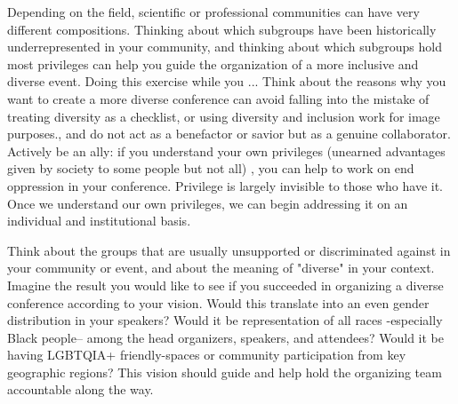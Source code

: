 \documentclass[10pt,letterpaper]{article}
\begin{document}
Depending on the field, scientific or professional communities can have very different compositions. Thinking about which subgroups have been historically underrepresented in your community, and thinking about which subgroups hold most privileges can help you guide the organization of a more inclusive and diverse event. Doing this exercise while you ...
Think about the reasons why you want to create a more diverse conference can avoid falling into the mistake of treating diversity as a checklist, or using diversity and inclusion work for image purposes., and do not act as a benefactor or savior but as a genuine collaborator.
Actively be an ally: if you understand your own privileges (unearned advantages given by society to some people but not all) \cite{}, you can help to work on end oppression in your conference. Privilege is largely invisible to those who have it. Once we understand our own privileges, we can begin addressing it on an individual and institutional basis.

Think about the groups that are usually unsupported or discriminated against in your community or event, and about the meaning of "diverse" in your context. Imagine the result you would like to see if you succeeded in organizing a diverse conference according to your vision. Would this translate into an even gender distribution in your speakers? Would it be representation of all races -especially Black people-- among the head organizers, speakers, and attendees? Would it be having LGBTQIA+ friendly-spaces or community participation from key geographic regions? This vision should guide and help hold the organizing team accountable along the way.


\end{document}
